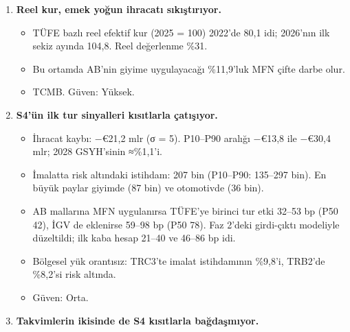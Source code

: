 \begin{enumerate}
  \begin{itemize}
  \tightlist
  \item
    Tasarruf-yatırım açığı kamu kesiminde: 2025'te −\%1,9 GSYH, 2029'da −\%2,2; özel kesim fazla veriyor. \etiketV{} OVP Tablo 1.1.
  \item
    OVP'nin 2029 cari denge hedefi −\%1,6.
  \item
    T+5'te (2033/2034) cari denge ≥ \%0 için ek iyileşme gerekiyor: \$25--48 mlr \etiketH{}.
  \item
    Ticaret önlemleri bu boşluğu ancak tasarruf-yatırım dengesini veya ihracat kapasitesini değiştirdikleri ölçüde kapatır (Lerner simetrisi).
  \item
    Güven: Orta.
  \end{itemize}
\item
  \textbf{Reel kur, emek yoğun ihracatı sıkıştırıyor.}

  \begin{itemize}
  \tightlist
  \item
    TÜFE bazlı reel efektif kur (2025 = 100) 2022'de 80,1 idi; 2026'nın ilk sekiz ayında 104,8. Reel değerlenme \%31.
  \item
    Bu ortamda AB'nin giyime uygulayacağı \%11,9'luk MFN çifte darbe olur.
  \item
    \etiketV{} TCMB. Güven: Yüksek.
  \end{itemize}
\item
  \textbf{S4'ün ilk tur sinyalleri kısıtlarla çatışıyor.}

  \begin{itemize}
  \tightlist
  \item
    İhracat kaybı: −€21,2 mlr (σ = 5). P10--P90 aralığı −€13,8 ile −€30,4 mlr; 2028 GSYH'sinin ≈\%1,1'i. \etiketT{}
  \item
    İmalatta risk altındaki istihdam: 207 bin (P10--P90: 135--297 bin). En büyük paylar giyimde (87 bin) ve otomotivde (36 bin). \etiketT{}
  \item
    AB mallarına MFN uygulanırsa TÜFE'ye birinci tur etki 32--53 bp (P50 42), İGV de eklenirse 59--98 bp (P50 78). Faz 2'deki girdi-çıktı modeliyle düzeltildi; ilk kaba hesap 21--40 ve 46--86 bp idi. \etiketT{}
  \item
    Bölgesel yük orantısız: TRC3'te imalat istihdamının \%9,8'i, TRB2'de \%8,2'si risk altında.
  \item
    Güven: Orta.
  \end{itemize}
\item
  \textbf{Takvimlerin ikisinde de S4 kısıtlarla bağdaşmıyor.}


\end{enumerate}
